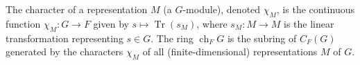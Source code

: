 The character of a representation $M$ (a $G$-module), denoted $\chi_M$, is the continuous function $\chi_M: G \to F$ given by $s \mapsto \operatorname{Tr}(s_M)$, where $s_M: M \to M$ is the linear transformation representing $s \in G$. The ring $\operatorname{ch}_F G$ is the subring of $C_F(G)$ generated by the characters $\chi_M$ of all (finite-dimensional) representations $M$ of $G$.
